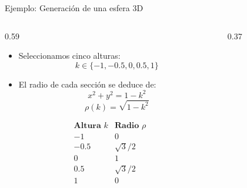 \documentclass[main.tex]{subfiles}
\begin{document}
\begin{frame}{Ejemplo: Generación de una esfera 3D}
  \begin{columns}[c,onlytextwidth]
    \begin{column}{0.59\textwidth}
      \begin{itemize}
        \item Seleccionamos cinco alturas:
              \[
                k\in\{-1,-0.5,0,0.5,1\}
              \]

        \item El radio de cada sección se deduce de:
              \[
                x^2+y^2=1-k^2
              \]
              \[
                \rho(k)=\sqrt{1-k^2}
              \]
      \end{itemize}

      \[
        \begin{array}{c|c}
          \textbf{Altura }k & \textbf{Radio }\rho \\ \hline
          -1   & 0 \\
          -0.5 & \sqrt{3}/2 \\
          0    & 1 \\
          0.5  & \sqrt{3}/2 \\
          1    & 0
        \end{array}
      \]
    \end{column}
    \begin{column}{0.37\textwidth}
      \centering
    \end{column}
  \end{columns}
\end{frame}
\end{document}
